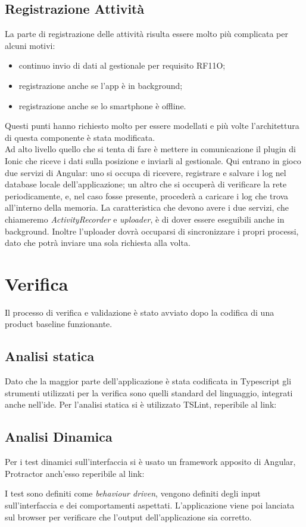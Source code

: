 \subsection{Registrazione Attività}
La parte di registrazione delle attività risulta essere molto più complicata per alcuni motivi:
\begin{itemize}
  \item continuo invio di dati al gestionale per requisito RF11O;
  \item registrazione anche se l'app è in background;
  \item registrazione anche se lo smartphone è offline.
\end{itemize}
Questi punti hanno richiesto molto per essere modellati e più volte l'architettura di questa componente è stata modificata. \\
\noindent Ad alto livello quello che si tenta di fare è mettere in comunicazione il plugin di Ionic che riceve i dati sulla posizione e inviarli al
gestionale. Qui entrano in gioco due servizi di Angular: uno si occupa di ricevere, registrare e salvare i log nel database locale
dell'applicazione; un altro che si occuperà di verificare la rete periodicamente, e, nel caso fosse presente, procederà a caricare i log che
trova all'interno della memoria. La caratteristica che devono avere i due servizi, che chiameremo \textit{ActivityRecorder} e \textit{uploader}, è di dover
essere eseguibili anche in background. Inoltre l'uploader dovrà occuparsi di sincronizzare i propri processi, dato che potrà inviare una
sola richiesta alla volta. 

\section{Verifica}
Il processo di verifica e validazione è stato avviato dopo la codifica di una \gls{product baseline} funzionante. 
\subsection{Analisi statica}
Dato che la maggior parte dell'applicazione è stata codificata in Typescript gli strumenti utilizzati per la verifica sono quelli standard
del linguaggio, integrati anche nell'\gls{ide}. Per l'analisi statica si è utilizzato TSLint, reperibile al link: \\
\begin{center}
  \cite{site:tslint}
\end{center}
\subsection{Analisi Dinamica}
Per i test dinamici sull'interfaccia si è usato un framework apposito di Angular, Protractor anch'esso reperibile al link: \\
\begin{center}
  \cite{site:protractor}
\end{center}
I test sono definiti come \textit{behaviour driven}, vengono definiti degli input sull'interfaccia e dei comportamenti aspettati.
L'applicazione viene poi lanciata sul browser per verificare che l'output dell'applicazione sia corretto.

